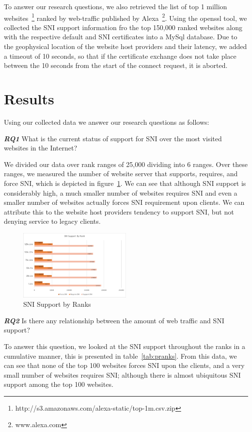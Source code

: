 \documentclass{acm_proc_article-sp}
\begin{document}
To answer our research questions, we also retrieved the list of top 1 million websites~\footnote{http://s3.amazonaws.com/alexa-static/top-1m.csv.zip} ranked by web-traffic published by Alexa~\footnote{www.alexa.com}. Using the openssl tool, we collected the SNI support information fro the top 150,000 ranked websites along with the respective default and SNI certificates into a MySql database. Due to the geophysical location of the website host providers and their latency, we added a timeout of 10 seconds, so that if the certificate exchange does not take place between the 10 seconds from the start of the connect request, it is aborted.

\section{Results} \label{sec:res}
Using our collected data we answer our research questions as follows:

\textbf{\textit{RQ1}} What is the current status of support for SNI over the most visited websites in the Internet?

We divided our data over rank ranges of 25,000 dividing into 6 ranges. Over these ranges, we measured the number of website server that supports, requires, and force SNI, which is depicted in figure~\ref{fig:sranks}. We can see that although SNI support is considerably high, a much smaller number of websites requires SNI and even a smaller number of websites actually forces SNI requirement upon clients. We can attribute this to the website host providers tendency to support SNI, but not denying service to legacy clients.

\begin{figure}[htbp]
\center
\includegraphics[width=0.5\textwidth]{by_rank_ranges}
\caption{SNI Support by Ranks}
\label{fig:sranks}
\end{figure}

\textbf{\textit{RQ2}} Is there any relationship between the amount of web traffic and SNI support?

To answer this question, we looked at the SNI support throughout the ranks in a cumulative manner, this is presented in table~\ref{tab:pranks}. From this data, we can see that none of the top 100 websites forces SNI upon the clients, and a very small number of websites requires SNI; although there is almost ubiquitous SNI support among the top 100 websites.
\end{document}
